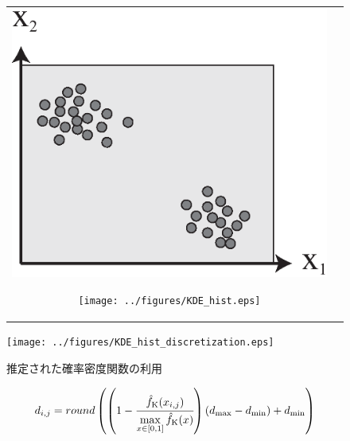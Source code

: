 \documentclass[../main/main]{subfiles}
\begin{document}
\begin{figure}[t]
\begin{tabular}{cc}
\begin{minipage}{0.35\hsize}
\includegraphics[width=0.95\linewidth]{../figures/mitsu_2.eps}
\begin{center}
\hspace{-0.3in}{\footnotesize (a) 設計変数空間における複数の密分布}
\end{center}
\end{minipage}
\begin{minipage}{0.64\hsize}
\texttt{[image: ../figures/KDE\_hist.eps]}
\begin{center}
\hspace{-0.3in}{\footnotesize (b) (a)の$x_1$における頻度ヒストグラムと推定された確率密度関数}
\end{center}
\end{minipage}
\end{tabular}
\vspace{0.1in}
\centering
\texttt{[image: ../figures/KDE\_hist\_discretization.eps]}\\
\hspace{-0.3in}{\footnotesize (c) 推定された確率密度関数の適応的離散化への適用}
\caption{推定された確率密度関数の利用}
\label{kde_hist}
\end{figure}

\begin{equation}
d_{i,j} = round \left ( \left(1 - \cfrac{\hat{f}_{\rm K}(x_{i,j})}{\mathop{\rm max}\limits_{x{}\in{}[0,1]}\hat{f}_{\rm K}(x)} \right) (d_{\rm max} - d_{\rm min} ) + d_{\rm min} \right )
\label{epdf_formulation}
\end{equation}
\end{document}
